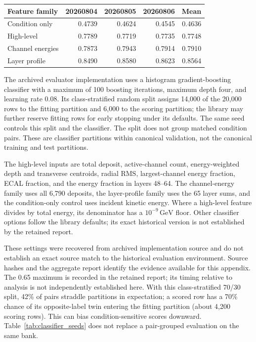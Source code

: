 \documentclass[11pt]{article}
\newcommand{\GeV}{\,\mathrm{GeV}}
\begin{document}
\begin{center}
\begin{minipage}{\linewidth}
\centering
{}
\label{tab:classifier_seeds}
\small
\begin{tabular}{@{}lrrrr@{}}
\toprule
Feature family & 20260804 & 20260805 & 20260806 & Mean \\
\midrule
Condition only & 0.4739 & 0.4624 & 0.4545 & 0.4636 \\
High-level & 0.7789 & 0.7719 & 0.7735 & 0.7748 \\
Channel energies & 0.7873 & 0.7943 & 0.7914 & 0.7910 \\
Layer profile & 0.8490 & 0.8580 & 0.8623 & 0.8564 \\
\bottomrule
\end{tabular}
\end{minipage}
\end{center}

The archived evaluator implementation uses a histogram gradient-boosting classifier with a maximum of 100 boosting iterations, maximum depth four, and learning rate 0.08. Its class-stratified random split assigns 14,000 of the 20,000 rows to the fitting partition and 6,000 to the scoring partition; the library may further reserve fitting rows for early stopping under its defaults. The same seed controls this split and the classifier. The split does not group matched condition pairs. These are classifier partitions within canonical validation, not the canonical training and test partitions.

The high-level inputs are total deposit, active-channel count, energy-weighted depth and transverse centroids, radial RMS, largest-channel energy fraction, ECAL fraction, and the energy fraction in layers 48--64. The channel-energy family uses all 6,790 deposits, the layer-profile family uses the 65 layer sums, and the condition-only control uses incident kinetic energy. Where a high-level feature divides by total energy, its denominator has a $10^{-9}\GeV$ floor. Other classifier options follow the library defaults; its exact historical version is not established by the retained report.

These settings were recovered from archived implementation source and do not establish an exact source match to the historical evaluation environment. Source hashes and the aggregate report identify the evidence available for this appendix. The 0.65 maximum is recorded in the retained report; its timing relative to analysis is not independently established here. With this class-stratified 70/30 split, 42\% of pairs straddle partitions in expectation; a scored row has a 70\% chance of its opposite-label twin entering the fitting partition (about 4,200 scoring rows). This can bias condition-sensitive scores downward. Table~\ref{tab:classifier_seeds} does not replace a pair-grouped evaluation on the same bank.

\printbibliography
\end{document}
